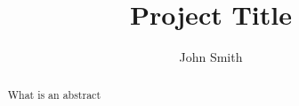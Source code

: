 \documentclass[a4paper, two side]{report}
\title{Project Title}
\author{John Smith}
\begin{document}




\begin{abstract}
What is an abstract
\end{abstract}


\tableofcontents








%
%





\end{document}
